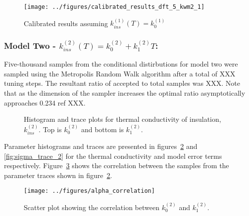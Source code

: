 \documentclass[article]{proc}
\begin{document}
        \begin{figure}[!]
            \centering
            \texttt{[image: ../figures/calibrated\_results\_dft\_5\_kwm2\_1]}
            \caption{Calibrated results assuming $k^{(1)}_{ins}(T) = k^{(1)}_0$}
            \label{fig:cal_results_1}
        \end{figure}

        \subsubsection{Model Two - $k^{(2)}_{ins}(T) = k^{(2)}_0 + k^{(2)}_1 T$:}

        Five-thousand samples from the conditional distirbutions for model two were sampled using the Metropolis Random Walk algorithm after a total of XXX tuning steps. The resultant ratio of accepted to total samples was XXX. Note that as the dimension of the sampler increases the optimal ratio asymptotically approaches 0.234 ref XXX. 

        \begin{figure}[b!]
            \centering
            \qquad

            \qquad
            \caption{Histogram and trace plots for thermal conductivity of insulation, $k^{(2)}_{ins}$. Top is $k^{(2)}_0$ and bottom is $k^{(2)}_1$.}
            \label{fig:param_trace_2}
        \end{figure}

        Parameter histograms and traces are presented in figures~\ref{fig:param_trace_2} and \ref{fig:sigma_trace_2} for the thermal conductivity and model error terms respectively. Figure~\ref{fig:alpha_correlation} shows the correlation between the samples from the parameter traces shown in figure~\ref{fig:param_trace_2}. 

        \begin{figure}[h!]
            \centering
            \texttt{[image: ../figures/alpha\_correlation]}
            \caption{Scatter plot showing the correlation between $k^{(2)}_0$ and $k^{(2)}_1$.}
            \label{fig:alpha_correlation}
        \end{figure}
\end{document}
